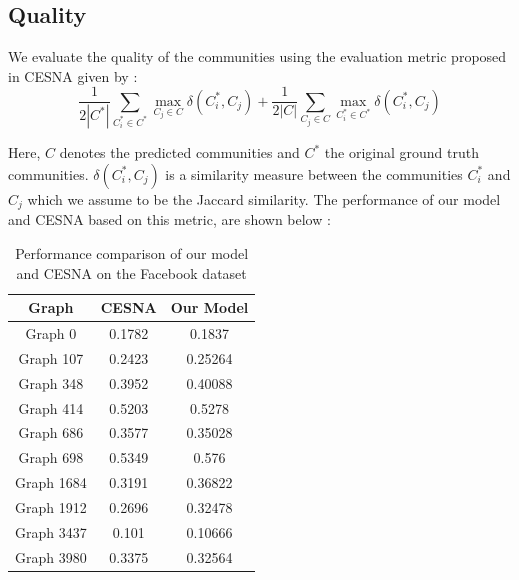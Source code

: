 \documentclass[11pt]{article}
\begin{document}
\subsection{Quality}
We evaluate the quality of the communities using the evaluation metric proposed in CESNA given by : 
\[ \frac{1}{2 |C^{*}|} \sum\limits_{C_i^{*} \in C^{*}} \max_{C_j \in C} \delta (C_i^{*}, C_j) + \frac{1}{2 |C|} \sum\limits_{C_j \in C} \max_{C_i^{*} \in C^{*}} \delta (C_i^{*}, C_j) \]

Here, $C$ denotes the  predicted communities and $C^{*}$ the original ground truth communities. $\delta(C_i^{*}, C_j)$ is a similarity measure between the communities $C_i^{*}$ and $C_j$ which we assume to be the Jaccard similarity. The performance of our model and CESNA based on this metric, are shown below :

\begin{table}[H]
\begin{center}
\begin{tabular}{|c|c|c|}
\hline
\textbf{Graph} & \textbf{CESNA} & \textbf{Our Model} \\ \hline
Graph 0 & 0.1782 & 0.1837 \\ \hline
Graph 107 & 0.2423 & 0.25264 \\ \hline
Graph 348 & 0.3952 & 0.40088 \\ \hline
Graph 414 & 0.5203 & 0.5278 \\ \hline
Graph 686 & 0.3577 & 0.35028 \\ \hline
Graph 698 & 0.5349 & 0.576 \\ \hline
Graph 1684 & 0.3191 & 0.36822 \\ \hline
Graph 1912 & 0.2696 & 0.32478 \\ \hline
Graph 3437 & 0.101 & 0.10666 \\ \hline
Graph 3980 & 0.3375 & 0.32564 \\ \hline
\end{tabular}
\end{center}
\caption{Performance comparison of our model and CESNA on the Facebook dataset}
\end{table}
\end{document}
